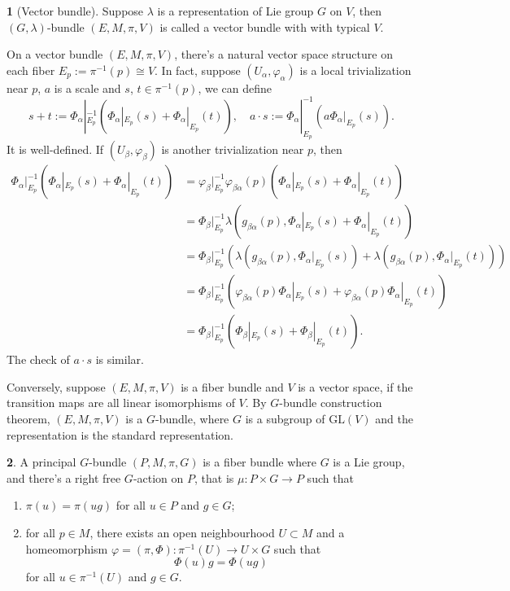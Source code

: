 \documentclass[11pt]{article}
\theoremstyle{definition}
\newtheorem{para}{}[part]
\begin{document}
\begin{para}[Vector bundle]
	Suppose $\lambda$ is a representation of Lie group $G$ on $V$, then $(G,\lambda)$-bundle $(E,M,\pi,V)$ is called a vector bundle with with typical $V$.

	On a vector bundle $(E,M,\pi,V)$, there's a natural vector space structure on each fiber $E_p:=\pi^{-1}(p)\cong V$. In fact, suppose $(U_\alpha,\varphi_\alpha)$ is a local trivialization near $p$, $a$ is a scale and $s$, $t\in \pi^{-1}(p)$, we can define
	\[
	s+t:=\Phi_{\alpha}|_{E_p}^{-1}\left(\Phi_{\alpha}|_{E_p}(s)+\Phi_{\alpha}|_{E_p}(t)\right),\quad a\cdot s:=\Phi_{\alpha}|_{E_p}^{-1}\left(a\Phi_{\alpha}|_{E_p}(s)\right).
	\]
	It is well-defined. If $(U_\beta,\varphi_\beta)$ is another trivialization near $p$, then
	\[
	\begin{aligned}
	\Phi_{\alpha}|_{E_p}^{-1}\left(\Phi_{\alpha}|_{E_p}(s)+\Phi_{\alpha}|_{E_p}(t)\right)&=\varphi_\beta|_{E_p}^{-1}\varphi_{\beta\alpha}(p)\left(\Phi_{\alpha}|_{E_p}(s)+\Phi_{\alpha}|_{E_p}(t)\right)\\
	&=\Phi_\beta|_{E_p}^{-1}\lambda\left(g_{\beta\alpha}(p),\Phi_{\alpha}|_{E_p}(s)+\Phi_{\alpha}|_{E_p}(t)\right)\\
	&=\Phi_\beta|_{E_p}^{-1}\left(\lambda\left(g_{\beta\alpha}(p),\Phi_{\alpha}|_{E_p}(s)\right)+\lambda\left(g_{\beta\alpha}(p),\Phi_{\alpha}|_{E_p}(t)\right)\right)\\
	&=\Phi_\beta|_{E_p}^{-1}\left(\varphi_{\beta\alpha}(p)\Phi_{\alpha}|_{E_p}(s)+\varphi_{\beta\alpha}(p)\Phi_{\alpha}|_{E_p}(t)\right)\\
	&=\Phi_\beta|_{E_p}^{-1}\left(\Phi_{\beta}|_{E_p}(s)+\Phi_{\beta}|_{E_p}(t)\right).
	\end{aligned}
	\]
	The check of $a\cdot s$ is similar.

	Conversely, suppose $(E,M,\pi,V)$ is a fiber bundle and $V$ is a vector space, if the transition maps are all linear isomorphisms of $V$. By $G$-bundle construction theorem, $(E,M,\pi,V)$ is a $G$-bundle, where $G$ is a subgroup of $\mathrm{GL}(V)$ and the representation is the standard representation.
\end{para}

\begin{para}
A principal $G$-bundle $(P,M,\pi,G)$ is a fiber bundle where $G$ is a Lie group, and there's a right free $G$-action on $P$, that is $\mu:P\times G\to P$ such that
\begin{enumerate}
	\item $\pi(u)=\pi(ug)$ for all $u\in P$ and $g\in G$;
	\item for all $p\in M$, there exists an open neighbourhood $U\subset M$ and a homeomorphism $\varphi=(\pi,\Phi):\pi^{-1}(U)\to U\times G$ such that
	\[
	\Phi(u)g=\Phi(ug)
	\]
	for all $u\in \pi^{-1}(U)$ and $g\in G$.
\end{enumerate}
\end{para}
\end{document}

